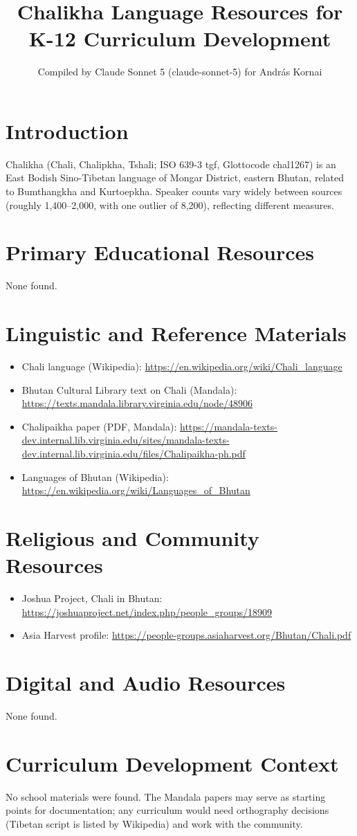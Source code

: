 \documentclass[12pt]{article}
\title{Chalikha Language Resources for K-12 Curriculum Development}
\author{Compiled by Claude Sonnet 5 (claude-sonnet-5) for Andr\'as Kornai}
\date{}
\begin{document}
\maketitle

\section{Introduction}
Chalikha (Chali, Chalipkha, Tshali; ISO 639-3 tgf, Glottocode chal1267) is an East Bodish Sino-Tibetan language of Mongar District, eastern Bhutan, related to Bumthangkha and Kurtoepkha. Speaker counts vary widely between sources (roughly 1,400--2,000, with one outlier of 8,200), reflecting different measures.

\section{Primary Educational Resources}
None found.

\section{Linguistic and Reference Materials}
\begin{itemize}
\item Chali language (Wikipedia): \url{https://en.wikipedia.org/wiki/Chali_language}
\item Bhutan Cultural Library text on Chali (Mandala): \url{https://texts.mandala.library.virginia.edu/node/48906}
\item Chalipaikha paper (PDF, Mandala): \url{https://mandala-texts-dev.internal.lib.virginia.edu/sites/mandala-texts-dev.internal.lib.virginia.edu/files/Chalipaikha-ph.pdf}
\item Languages of Bhutan (Wikipedia): \url{https://en.wikipedia.org/wiki/Languages_of_Bhutan}
\end{itemize}

\section{Religious and Community Resources}
\begin{itemize}
\item Joshua Project, Chali in Bhutan: \url{https://joshuaproject.net/index.php/people_groups/18909}
\item Asia Harvest profile: \url{https://people-groups.asiaharvest.org/Bhutan/Chali.pdf}
\end{itemize}

\section{Digital and Audio Resources}
None found.

\section{Curriculum Development Context}
No school materials were found. The Mandala papers may serve as starting points for documentation; any curriculum would need orthography decisions (Tibetan script is listed by Wikipedia) and work with the community.
\end{document}
